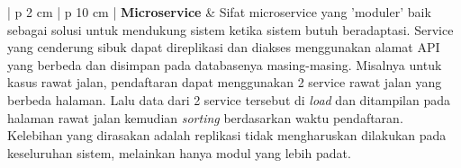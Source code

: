 \begin{enumerate}[leftmargin=*]
\begin{table}[H]
\begin{adjustbox}{width=1\textwidth}
\begin{tabular}{| p {2 cm} | p {10 cm} |}
				\hline
				\textbf{Microservice} & Sifat microservice yang 'moduler' baik sebagai solusi untuk mendukung sistem ketika sistem butuh beradaptasi. Service yang cenderung sibuk dapat direplikasi dan diakses menggunakan alamat API yang berbeda dan disimpan pada databasenya masing-masing. Misalnya untuk kasus rawat jalan, pendaftaran dapat menggunakan 2 service rawat jalan yang berbeda halaman. Lalu data dari 2 service tersebut di \textit{load} dan ditampilan pada halaman rawat jalan kemudian \textit{sorting} berdasarkan waktu pendaftaran. Kelebihan yang dirasakan adalah replikasi tidak mengharuskan dilakukan pada keseluruhan sistem, melainkan hanya modul yang lebih padat.\\
				\hline
			\end{tabular}
		\end{adjustbox}
	\end{table}
\end{enumerate}
\newpage
